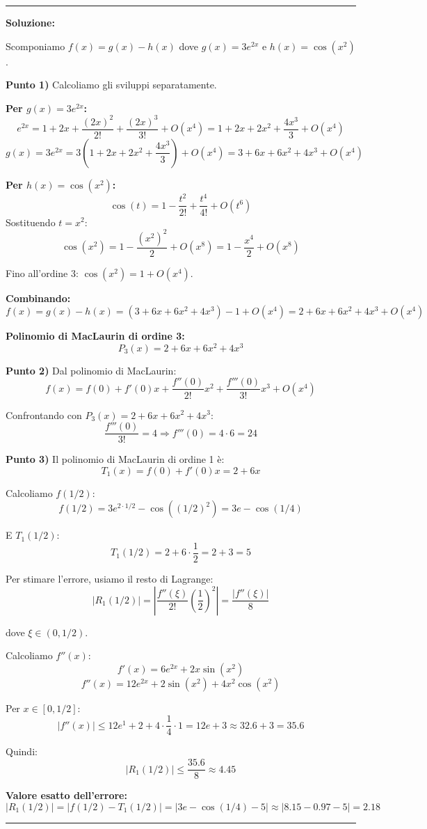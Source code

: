 \documentclass[12pt, a4paper]{article}
\newenvironment{solution}
{\par\noindent\rule{\textwidth}{0.4pt}\par\textbf{Soluzione:}\medskip\par}
{\par\rule{\textwidth}{0.4pt}\par\bigskip}
\begin{document}
\begin{solution}
Scomponiamo $f(x) = g(x) - h(x)$ dove $g(x) = 3e^{2x}$ e $h(x) = \cos(x^2)$.

\textbf{Punto 1)} Calcoliamo gli sviluppi separatamente.

\textbf{Per $g(x) = 3e^{2x}$:}
\[
e^{2x} = 1 + 2x + \frac{(2x)^2}{2!} + \frac{(2x)^3}{3!} + O(x^4) = 1 + 2x + 2x^2 + \frac{4x^3}{3} + O(x^4)
\]
\[
g(x) = 3e^{2x} = 3\left(1 + 2x + 2x^2 + \frac{4x^3}{3}\right) + O(x^4) = 3 + 6x + 6x^2 + 4x^3 + O(x^4)
\]

\textbf{Per $h(x) = \cos(x^2)$:}
\[
\cos(t) = 1 - \frac{t^2}{2!} + \frac{t^4}{4!} + O(t^6)
\]
Sostituendo $t = x^2$:
\[
\cos(x^2) = 1 - \frac{(x^2)^2}{2} + O(x^8) = 1 - \frac{x^4}{2} + O(x^8)
\]

Fino all'ordine 3: $\cos(x^2) = 1 + O(x^4)$.

\textbf{Combinando:}
\[
f(x) = g(x) - h(x) = (3 + 6x + 6x^2 + 4x^3) - 1 + O(x^4) = 2 + 6x + 6x^2 + 4x^3 + O(x^4)
\]

\textbf{Polinomio di MacLaurin di ordine 3:}
\[
P_3(x) = 2 + 6x + 6x^2 + 4x^3
\]

\vspace{0.5cm}

\textbf{Punto 2)} Dal polinomio di MacLaurin:
\[
f(x) = f(0) + f'(0)x + \frac{f''(0)}{2!}x^2 + \frac{f'''(0)}{3!}x^3 + O(x^4)
\]

Confrontando con $P_3(x) = 2 + 6x + 6x^2 + 4x^3$:
\[
\frac{f'''(0)}{3!} = 4 \Rightarrow f'''(0) = 4 \cdot 6 = 24
\]

\vspace{0.5cm}

\textbf{Punto 3)} Il polinomio di MacLaurin di ordine 1 è:
\[
T_1(x) = f(0) + f'(0)x = 2 + 6x
\]

Calcoliamo $f(1/2)$:
\[
f(1/2) = 3e^{2 \cdot 1/2} - \cos((1/2)^2) = 3e - \cos(1/4)
\]

E $T_1(1/2)$:
\[
T_1(1/2) = 2 + 6 \cdot \frac{1}{2} = 2 + 3 = 5
\]

Per stimare l'errore, usiamo il resto di Lagrange:
\[
|R_1(1/2)| = \left|\frac{f''(\xi)}{2!} \left(\frac{1}{2}\right)^2\right| = \frac{|f''(\xi)|}{8}
\]

dove $\xi \in (0, 1/2)$.

Calcoliamo $f''(x)$:
\[
f'(x) = 6e^{2x} + 2x\sin(x^2)
\]
\[
f''(x) = 12e^{2x} + 2\sin(x^2) + 4x^2\cos(x^2)
\]

Per $x \in [0, 1/2]$:
\[
|f''(x)| \leq 12e^1 + 2 + 4 \cdot \frac{1}{4} \cdot 1 = 12e + 3 \approx 32.6 + 3 = 35.6
\]

Quindi:
\[
|R_1(1/2)| \leq \frac{35.6}{8} \approx 4.45
\]

\textbf{Valore esatto dell'errore:}
\[
|R_1(1/2)| = |f(1/2) - T_1(1/2)| = |3e - \cos(1/4) - 5| \approx |8.15 - 0.97 - 5| = 2.18
\]
\end{solution}
\end{document}
